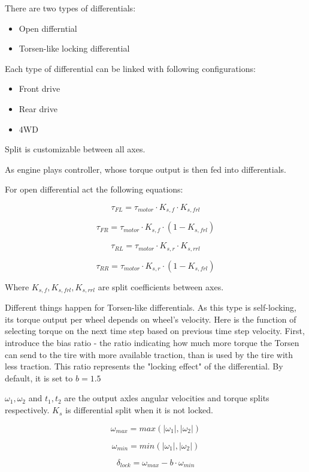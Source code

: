 \documentclass[a4paper,11pt]{article}
\begin{document}
There are two types of differentials:
\begin{itemize}
	\item Open differntial
	\item Torsen-like locking differential \cite{torsen-whitepaper}
\end{itemize}

Each type of differential can be linked with following configurations:
\begin{itemize}
	\item Front drive
	\item Rear drive
	\item 4WD
\end{itemize}

Split is customizable between all axes.

As engine plays controller, whose torque output is then fed into differentials.

For open differential act the following equations:

$$
\tau_{FL} = \tau_{motor} \cdot K_{s,f} \cdot K_{s,frl}
$$

$$
\tau_{FR} = \tau_{motor} \cdot K_{s,f} \cdot (1 - K_{s,frl})
$$

$$
\tau_{RL} = \tau_{motor} \cdot K_{s,r} \cdot K_{s,rrl}
$$

$$
\tau_{RR} = \tau_{motor} \cdot K_{s,r} \cdot (1 - K_{s,frl})
$$


Where $K_{s,f}, K_{s,frl}, K_{s,rrl}$ are split coefficients between axes.

Different things happen for Torsen-like differentials.
As this type is self-locking, its torque output per wheel depends on wheel's velocity. Here is the function of selecting torque on the next time step based on previous time step velocity. First, introduce the bias ratio - the ratio indicating how much more torque the Torsen can send to the tire with more available traction, than is used by the tire with less traction. This ratio represents the "locking effect" of the differential. By default, it is set to $b = 1.5$

$\omega_1, \omega_2$ and $t_1, t_2$ are the output axles angular velocities and torque splits respectively. $K_s$ is differential split when it is not locked.

$$
\omega_{max} = max(|\omega_1|, |\omega_2|)
$$

$$
\omega_{min} = min(|\omega_1|, |\omega_2|)
$$

$$
\delta_{lock} = \omega_{max} - b \cdot \omega_{min}
$$
\end{document}
